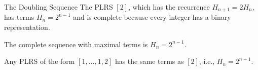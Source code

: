 \documentclass{beamer}
\begin{document}
\begin{frame}{The Doubling Sequence}
    The PLRS $[2]$, which has the recurrence $H_{n+1} = 2H_n$, has terms $H_n = 2^{n - 1}$ and is complete because every integer has a binary representation.
    \pause
    \bigskip
    \begin{theorem}[Brown]
    The complete sequence with maximal terms is $H_n= 2^{n-1}$.
    \end{theorem}
    \pause
    \bigskip
    Any PLRS of the form $[1, \ldots, 1, 2]$ has the same terms as $[2]$, i.e., $H_n = 2^{n - 1}$.
\end{frame}
    
    
\end{document}
